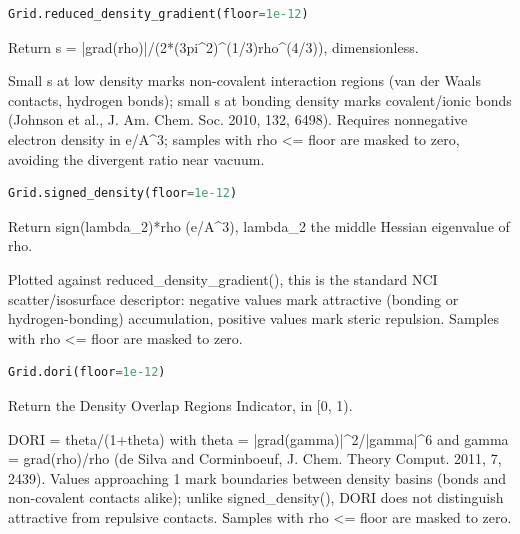 \begin{samepage}

\begin{lstlisting}[language=Python]
Grid.reduced_density_gradient(floor=1e-12)
\end{lstlisting}

Return s = |grad(rho)|/\allowbreak{}(2*(3pi\textasciicircum{}2)\textasciicircum{}(1/\allowbreak{}3)rho\textasciicircum{}(4/\allowbreak{}3)), dimensionless.

Small s at low density marks non-covalent interaction regions (van der
Waals contacts, hydrogen bonds); small s at bonding density marks
covalent/\allowbreak{}ionic bonds (Johnson et al., J. Am. Chem. Soc. 2010, 132,
6498). Requires nonnegative electron density in e/\allowbreak{}A\textasciicircum{}3; samples with
rho <= floor are masked to zero, avoiding the divergent ratio near vacuum.

\end{samepage}



\begin{samepage}

\begin{lstlisting}[language=Python]
Grid.signed_density(floor=1e-12)
\end{lstlisting}

Return sign(lambda\_\allowbreak{}2)*rho (e/\allowbreak{}A\textasciicircum{}3), lambda\_\allowbreak{}2 the middle Hessian eigenvalue of rho.

Plotted against reduced\_\allowbreak{}density\_\allowbreak{}gradient(), this is the standard NCI
scatter/\allowbreak{}isosurface descriptor: negative values mark attractive
(bonding or hydrogen-bonding) accumulation, positive values mark
steric repulsion. Samples with rho <= floor are masked to zero.

\end{samepage}



\begin{samepage}

\begin{lstlisting}[language=Python]
Grid.dori(floor=1e-12)
\end{lstlisting}

Return the Density Overlap Regions Indicator, in [0, 1).

DORI = theta/\allowbreak{}(1+theta) with theta = |grad(gamma)|\textasciicircum{}2/\allowbreak{}|gamma|\textasciicircum{}6 and
gamma = grad(rho)/\allowbreak{}rho (de Silva and Corminboeuf, J. Chem. Theory
Comput. 2011, 7, 2439). Values approaching 1 mark boundaries between
density basins (bonds and non-covalent contacts alike); unlike
signed\_\allowbreak{}density(), DORI does not distinguish attractive from repulsive
contacts. Samples with rho <= floor are masked to zero.

\end{samepage}



